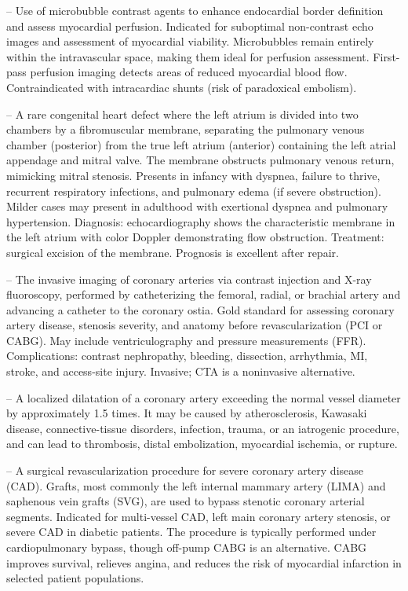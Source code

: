 -- Use of microbubble contrast agents to enhance endocardial border definition and assess myocardial perfusion. Indicated for suboptimal non-contrast echo images and assessment of myocardial viability. Microbubbles remain entirely within the intravascular space, making them ideal for perfusion assessment. First-pass perfusion imaging detects areas of reduced myocardial blood flow. Contraindicated with intracardiac shunts (risk of paradoxical embolism).

-- A rare congenital heart defect where the left atrium is divided into two chambers by a fibromuscular membrane, separating the pulmonary venous chamber (posterior) from the true left atrium (anterior) containing the left atrial appendage and mitral valve. The membrane obstructs pulmonary venous return, mimicking mitral stenosis. Presents in infancy with dyspnea, failure to thrive, recurrent respiratory infections, and pulmonary edema (if severe obstruction). Milder cases may present in adulthood with exertional dyspnea and pulmonary hypertension. Diagnosis: echocardiography shows the characteristic membrane in the left atrium with color Doppler demonstrating flow obstruction. Treatment: surgical excision of the membrane. Prognosis is excellent after repair.

-- The invasive imaging of coronary arteries via contrast injection and X-ray fluoroscopy, performed by catheterizing the femoral, radial, or brachial artery and advancing a catheter to the coronary ostia. Gold standard for assessing coronary artery disease, stenosis severity, and anatomy before revascularization (PCI or CABG). May include ventriculography and pressure measurements (FFR). Complications: contrast nephropathy, bleeding, dissection, arrhythmia, MI, stroke, and access-site injury. Invasive; CTA is a noninvasive alternative.

-- A localized dilatation of a coronary artery exceeding the normal vessel diameter by approximately 1.5 times. It may be caused by atherosclerosis, Kawasaki disease, connective-tissue disorders, infection, trauma, or an iatrogenic procedure, and can lead to thrombosis, distal embolization, myocardial ischemia, or rupture.

-- A surgical revascularization procedure for severe coronary artery disease (CAD). Grafts, most commonly the left internal mammary artery (LIMA) and saphenous vein grafts (SVG), are used to bypass stenotic coronary arterial segments. Indicated for multi-vessel CAD, left main coronary artery stenosis, or severe CAD in diabetic patients. The procedure is typically performed under cardiopulmonary bypass, though off-pump CABG is an alternative. CABG improves survival, relieves angina, and reduces the risk of myocardial infarction in selected patient populations.

